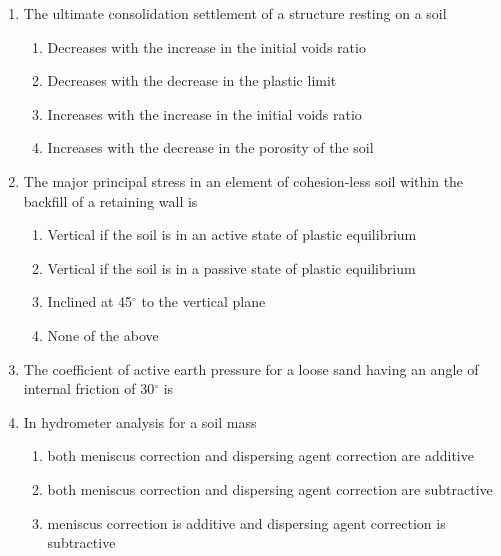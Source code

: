 \documentclass[11pt,a4paper]{article}
\begin{document}
\begin{enumerate}
\item{The ultimate consolidation settlement of a structure resting on a soil}
\begin{enumerate}[label=\Alph*.]
\item{Decreases with the increase in the initial voids ratio}
\item{Decreases with the decrease in the plastic limit}
\item{Increases with the increase in the initial voids ratio}
\item{Increases with the decrease in the porosity of the soil}
\end{enumerate}
\item{The major principal stress in an element of cohesion-less soil within the backfill of a retaining wall is}
\begin{enumerate}[label=\Alph*.]
\item{Vertical if the soil is in an active state of plastic equilibrium}
\item{Vertical if the soil is in a passive state of plastic equilibrium}
\item{Inclined at 45$^\circ$ to the vertical plane}
\item{None of the above}
\end{enumerate}
\item{The coefficient of active earth pressure for a loose sand having an angle of internal friction of 30$^\circ$ is
}
\\
\item{In hydrometer analysis for a soil mass}
\begin{enumerate}[label=\Alph*.]
\item{both meniscus correction and dispersing agent correction are additive}
\item{both meniscus correction and dispersing agent correction are subtractive}
\item{meniscus correction is additive and dispersing agent correction is subtractive}

\end{enumerate}
\end{enumerate}
\end{document}

